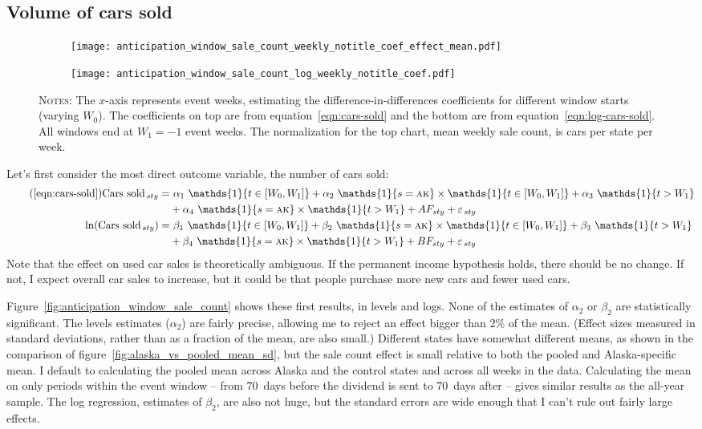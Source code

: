 \documentclass[11pt,letterpaper,oneside]{article}
\let\originalleft\left
\let\originalright\right
\renewcommand{\left}{\mathopen{}\mathclose\bgroup\originalleft}
\renewcommand{\right}{\aftergroup\egroup\originalright}
\newcommand{\snippet}[1]{\hspace{-0.15em}}
\newcommand{\indicator}[1]{\mathds{1}\left\{#1\right\}}
\newcommand{\anticipation}{\indicator{t \in [W_0, W_1]}}
\newcommand{\isAlaska}{\indicator{s = \textsc{ak}}}
\newcommand{\postWindow}{\indicator{t > W_1}}
\newcommand{\ddEqn}[3]{%
\text{#1}_{\, sty} = & \  #2_1 \ \anticipation + #2_2 \ \isAlaska \times \anticipation + #2_3 \ \postWindow \\ \nonumber
&+ #2_4 \ \isAlaska \times \postWindow + #3 F_{ sty} + \varepsilon_{\, sty}
}
\newcommand{\ddEqnLog}[3]{%
\ln\left(\text{#1}_{\, sty}\right) = & \  #2_1 \ \anticipation + #2_2 \ \isAlaska \times \anticipation + #2_3 \ \postWindow \\ \nonumber
&+ #2_4 \ \isAlaska \times \postWindow + #3 F_{ sty} + \varepsilon_{\, sty}
}
\begin{document}
\begin{doublespacing}
\subsection{Volume of cars sold}


\begin{figure}[!hbtp]
    \caption{$\alpha_2$ and $\beta_2$, the treatment coefficients on Alaska $\times$ anticipation, for varying windows}
    \label{fig:anticipation_window_sale_count}
    \begin{subfigure}{\linewidth}
    \texttt{[image: anticipation\_window\_sale\_count\_weekly\_notitle\_coef\_effect\_mean.pdf]}
    \end{subfigure}
    \begin{subfigure}{\linewidth}
    \texttt{[image: anticipation\_window\_sale\_count\_log\_weekly\_notitle\_coef.pdf]}
    \end{subfigure}

    {\footnotesize
    \textsc{Notes:}
    The $x$-axis represents event weeks, estimating the difference\hyp{}in\hyp{}differences coefficients for different window starts (varying $W_0$).
    The coefficients on top are from equation~\ref{eqn:cars-sold} and the bottom are from equation~\ref{eqn:log-cars-sold}.
    All windows end at $W_1 = -1$ event weeks.
    The normalization for the top chart, mean weekly sale count, is \snippet{sales_count_weekly_mean.tex} cars per state per week.
    }
\end{figure}


Let's first consider the most direct outcome variable, the number of cars sold:
\begin{align}
    \tag{\ref{eqn:cars-sold}}
    \ddEqn{Cars sold}{\alpha}{A}\\
    \label{eqn:log-cars-sold}
    \ddEqnLog{Cars sold}{\beta}{B}
\end{align}
Note that the effect on used car sales is theoretically ambiguous.
If the permanent income hypothesis holds, there should be no change.
If not, I expect overall car sales to increase, but it could be that people purchase more new cars and fewer used cars.

Figure~\ref{fig:anticipation_window_sale_count} shows these first results, in levels and logs.
None of the estimates of $\alpha_2$ or $\beta_2$ are statistically significant.
The levels estimates ($\alpha_2$) are fairly precise, allowing me to reject an effect bigger than 2\% of the mean.
(Effect sizes measured in standard deviations, rather than as a fraction of the mean, are also small.)
Different states have somewhat different means, as shown in the comparison of figure~\ref{fig:alaska_vs_pooled_mean_sd}, but the sale count effect is small relative to both the pooled and Alaska\hyp{}specific mean.
I default to calculating the pooled mean across Alaska and the control states and across all weeks in the data.
Calculating the mean on only periods within the event window -- from 70~days before the dividend is sent to 70~days after -- gives similar results as the all\hyp{}year sample.
The log regression, estimates of $\beta_2$, are also not huge, but the standard errors are wide enough that I can't rule out fairly large effects.


\end{doublespacing}
\end{document}
